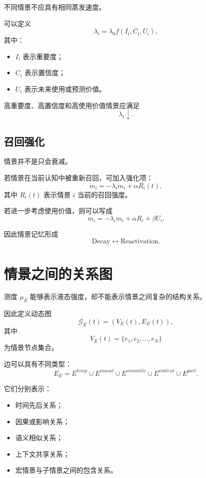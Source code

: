 不同情景不应具有相同蒸发速度。

可以定义
\[
\lambda_i
=
\lambda_0
f
\left(
I_i,
C_i,
U_i
\right),
\]
其中：

\begin{itemize}
    \item $I_i$ 表示重要度；
    \item $C_i$ 表示置信度；
    \item $U_i$ 表示未来使用或预测价值。
\end{itemize}

高重要度、高置信度和高使用价值情景应满足
\[
\lambda_i\downarrow.
\]

\subsection{召回强化}

情景并不是只会衰减。

若情景在当前认知中被重新召回，可加入强化项：
\[
\boxed{
\dot m_i
=
-\lambda_i m_i
+
\alpha R_i(t),
}
\]
其中 $R_i(t)$ 表示情景 $i$ 当前的召回强度。

若进一步考虑使用价值，则可以写成
\[
\dot m_i
=
-\lambda_i m_i
+
\alpha R_i
+
\beta U_i.
\]

因此情景记忆形成
\[
\boxed{
\mathrm{Decay}
\leftrightarrow
\mathrm{Reactivation}.
}
\]

\section{情景之间的关系图}

测度 $\mu_E$ 能够表示液态强度，却不能表示情景之间复杂的结构关系。

因此定义动态图
\[
\boxed{
\mathcal{G}_E(t)
=
\left(
V_E(t),
E_E(t)
\right),
}
\]
其中
\[
V_E(t)
=
\{e_1,e_2,\ldots,e_N\}
\]
为情景节点集合。

边可以具有不同类型：
\[
E_E
=
E^{temp}
\cup
E^{causal}
\cup
E^{semantic}
\cup
E^{context}
\cup
E^{part}.
\]

它们分别表示：

\begin{itemize}
    \item 时间先后关系；
    \item 因果或影响关系；
    \item 语义相似关系；
    \item 上下文共享关系；
    \item 宏情景与子情景之间的包含关系。
\end{itemize}

